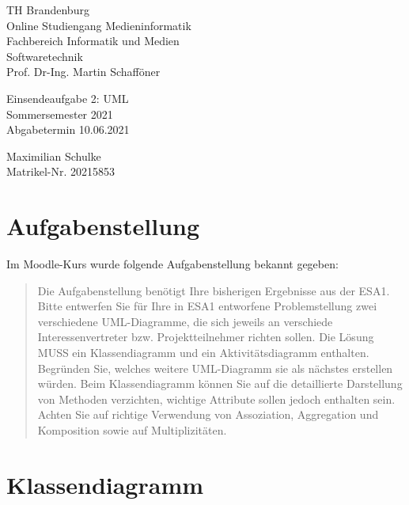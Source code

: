 \documentclass{article}
\begin{document}
\begin{titlepage}
	\begin{flushleft}
		TH Brandenburg \\
		Online Studiengang Medieninformatik \\
		Fachbereich Informatik und Medien \\
		Softwaretechnik \\
		Prof. Dr-Ing. Martin Schafföner
	\end{flushleft}

	\vfill

	\begin{center}
		\Large{Einsendeaufgabe 2: UML}\\[0.5em]
		\large{Sommersemester 2021}\\[0.25em]
		\large{Abgabetermin 10.06.2021}
	\end{center}

	\vfill

	\begin{flushright}
		Maximilian Schulke \\
		Matrikel-Nr. 20215853
	\end{flushright}
\end{titlepage}

\tableofcontents

\vfill

\section{Aufgabenstellung}

Im Moodle-Kurs wurde folgende Aufgabenstellung bekannt gegeben:

\begin{quote}
	Die Aufgabenstellung benötigt Ihre bisherigen Ergebnisse aus der ESA1.
	Bitte entwerfen Sie für Ihre in ESA1 entworfene Problemstellung zwei
	verschiedene UML-Diagramme, die sich jeweils an verschiede
	Interessenvertreter bzw. Projektteilnehmer richten sollen. Die Lösung MUSS
	ein Klassendiagramm und ein Aktivitätsdiagramm enthalten. Begründen Sie,
	welches weitere UML-Diagramm sie als nächstes erstellen würden. Beim
	Klassendiagramm können Sie auf die detaillierte Darstellung von Methoden
	verzichten, wichtige Attribute sollen jedoch enthalten sein. Achten Sie auf
	richtige Verwendung von Assoziation, Aggregation und Komposition sowie auf
	Multiplizitäten.
\end{quote}

\newpage

\section{Klassendiagramm}
\end{document}
